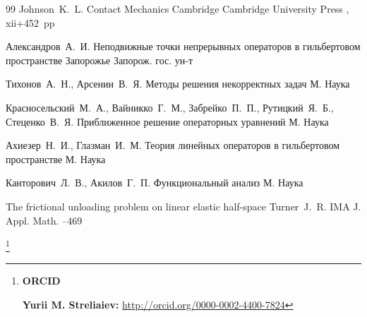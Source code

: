 \begin{thebibliography}{99}
\by Johnson~K.~L.
\book Contact Mechanics
\publaddr Cambridge 
\publ Cambridge University Press 
,
xii+452~pp


\by Александров~А.~И.
\book Неподвижные точки непрерывных операторов в гильбертовом пространстве
\publaddr Запорожье
\publ Запорож. гос. ун-т

\by Тихонов~А.~Н., Арсенин~В.~Я.
\book Методы решения некорректных задач
\publaddr М.
\publ Наука

\by Красносельский~М.~А., Вайникко~Г.~М., Забрейко~П.~П., Рутицкий~Я.~Б., Стеценко~В.~Я.
\book Приближенное решение операторных уравнений
\publaddr М.
\publ Наука

\by Ахиезер~Н.~И., Глазман~И.~М.
\book Теория линейных операторов в гильбертовом пространстве
\publaddr М.
\publ Наука

\by Канторович~Л.~В., Акилов~Г.~П.
\book Функциональный анализ
\publaddr М.
\publ Наука

\paper The frictional unloading problem on linear elastic half-space
\by    Turner~J.~R.
\jour  IMA J. Appl. Math.
--469

\end{thebibliography}

\RuDate

\newpage

\makeentitle


\thanks{{\bf ORCID}

{\bf  Yurii M. Streliaiev:} \url{http://orcid.org/0000-0002-4400-7824}

}

\EngRef



